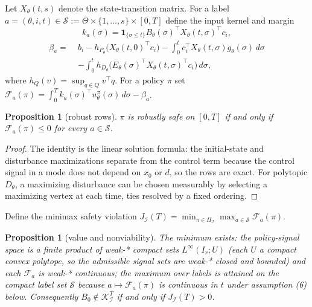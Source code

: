 \documentclass[10pt,twocolumn]{article}
\theoremstyle{plain}
\newtheorem{proposition}[theorem]{Proposition}
\theoremstyle{definition}
\theoremstyle{remark}
\begin{document}
Let \(X_\theta(t,s)\) denote the state-transition matrix. For a label
\(a = (\theta, i, t) \in \mathscr{S} := \Theta \times \{1,\dots,s\} \times
[0,T]\) define the input kernel and margin
\[
k_a(\sigma) = \mathbf{1}_{\{\sigma \le t\}} B_\theta(\sigma)^\top
X_\theta(t,\sigma)^\top c_i,
\]
\begin{align*}
\beta_a = \;& b_i - h_{P_\theta}\!\bigl(X_\theta(t,0)^\top c_i\bigr)
- \int_0^t c_i^\top X_\theta(t,\sigma) g_\theta(\sigma)\, d\sigma\\
& - \int_0^t h_{D_\theta}\!\bigl(E_\theta(\sigma)^\top
X_\theta(t,\sigma)^\top c_i\bigr)\, d\sigma,
\end{align*}
where \(h_Q(v) = \sup_{q \in Q} v^\top q\). For a policy \(\pi\) set
\(\mathcal{F}_a(\pi) = \int_0^T k_a(\sigma)^\top u^\pi_\theta(\sigma)\,
d\sigma - \beta_a\).

\begin{proposition}[robust rows]\label{lp-prop:rows}
\(\pi\) is robustly safe on \([0,T]\) if and only if
\(\mathcal{F}_a(\pi) \le 0\) for every \(a \in \mathscr{S}\).
\end{proposition}

\begin{proof}
The identity is the linear solution formula: the initial-state and
disturbance maximizations separate from the control term because the
control signal in a mode does not depend on \(x_0\) or \(d\), so the
rows are exact. For polytopic \(D_\theta\), a maximizing disturbance
can be chosen measurably by selecting a maximizing vertex at each time,
ties resolved by a fixed ordering.
\end{proof}

Define the minimax safety violation
\(J_{\mathcal{I}}(T) = \min_{\pi \in \Pi_{\mathcal{I}}} \max_{a \in
\mathscr{S}} \mathcal{F}_a(\pi)\).

\begin{proposition}[value and nonviability]\label{lp-prop:value}
The minimum exists: the policy-signal space is a finite product of
weak-* compact sets \(L^\infty(I_r; U)\) (each \(U\) a compact convex
polytope, so the admissible signal sets are weak-* closed and bounded) and
each \(\mathcal{F}_a\) is weak-* continuous; the maximum over labels is
attained on the compact label set \(\mathscr{S}\) because
\(a \mapsto \mathcal{F}_a(\pi)\) is continuous in \(t\) under
assumption (6) below. Consequently
\(B_0 \notin \mathcal{K}_{\mathcal{I}}^T\) if and only if
\(J_{\mathcal{I}}(T) > 0\).
\end{proposition}
\end{document}
